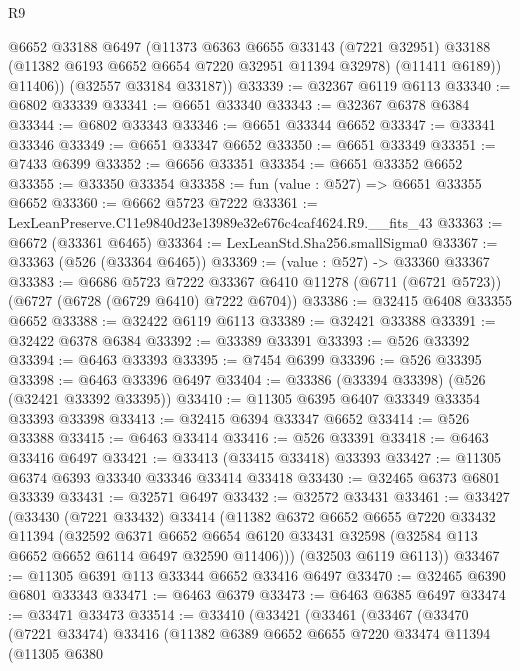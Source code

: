 \begin{lexlean}{R9}
\begin{coremodule}
          @6652
          @33188
          @6497
          (@11373
            @6363
            @6655
            @33143
            (@7221 @32951)
            @33188
            (@11382 @6193 @6652 @6654 @7220 @32951 @11394 @32978)
            (@11411 @6189))
          @11406))
      (@32557 @33184 @33187))
@33339 := @32367 @6119 @6113
@33340 := @6802 @33339
@33341 := @6651 @33340
@33343 := @32367 @6378 @6384
@33344 := @6802 @33343
@33346 := @6651 @33344 @6652
@33347 := @33341 @33346
@33349 := @6651 @33347 @6652
@33350 := @6651 @33349
@33351 := @7433 @6399
@33352 := @6656 @33351
@33354 := @6651 @33352 @6652
@33355 := @33350 @33354
@33358 := fun (value : @527) => @6651 @33355 @6652
@33360 := @6662 @5723 @7222
@33361 := LexLeanPreserve.C11e9840d23e13989e32e676c4caf4624.R9.__fits_43
@33363 := @6672 (@33361 @6465)
@33364 := LexLeanStd.Sha256.smallSigma0
@33367 := @33363 (@526 (@33364 @6465))
@33369 := (value : @527) -> @33360 @33367
@33383 := @6686
    @5723
    @7222
    @33367
    @6410
    @11278
    (@6711 (@6721 @5723))
    (@6727 (@6728 (@6729 @6410) @7222 @6704))
@33386 := @32415 @6408 @33355 @6652
@33388 := @32422 @6119 @6113
@33389 := @32421 @33388
@33391 := @32422 @6378 @6384
@33392 := @33389 @33391
@33393 := @526 @33392
@33394 := @6463 @33393
@33395 := @7454 @6399
@33396 := @526 @33395
@33398 := @6463 @33396 @6497
@33404 := @33386 (@33394 @33398) (@526 (@32421 @33392 @33395))
@33410 := @11305 @6395 @6407 @33349 @33354 @33393 @33398
@33413 := @32415 @6394 @33347 @6652
@33414 := @526 @33388
@33415 := @6463 @33414
@33416 := @526 @33391
@33418 := @6463 @33416 @6497
@33421 := @33413 (@33415 @33418) @33393
@33427 := @11305 @6374 @6393 @33340 @33346 @33414 @33418
@33430 := @32465 @6373 @6801 @33339
@33431 := @32571 @6497
@33432 := @32572 @33431
@33461 := @33427
    (@33430
      (@7221 @33432)
      @33414
      (@11382
        @6372
        @6652
        @6655
        @7220
        @33432
        @11394
        (@32592
          @6371
          @6652
          @6654
          @6120
          @33431
          @32598
          (@32584 @113 @6652 @6652 @6114 @6497 @32590 @11406)))
      (@32503 @6119 @6113))
@33467 := @11305 @6391 @113 @33344 @6652 @33416 @6497
@33470 := @32465 @6390 @6801 @33343
@33471 := @6463 @6379
@33473 := @6463 @6385 @6497
@33474 := @33471 @33473
@33514 := @33410
    (@33421
      (@33461
        (@33467
          (@33470
            (@7221 @33474)
            @33416
            (@11382
              @6389
              @6652
              @6655
              @7220
              @33474
              @11394
              (@11305
                @6380

\end{coremodule}
\end{lexlean}
